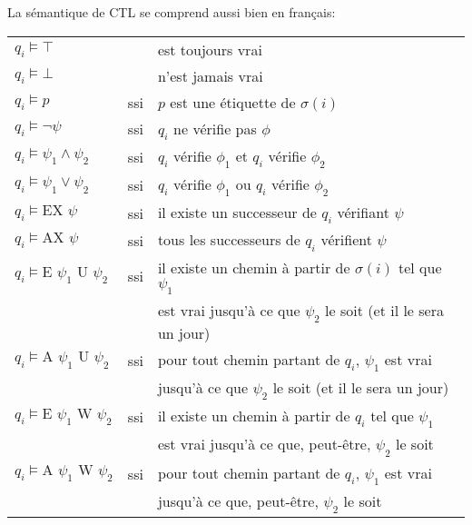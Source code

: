 \documentclass[10pt,a4paper]{article}
\begin{document}
\bigskip

La sémantique de CTL se comprend aussi bien en français:

\begin{tabular}{lcl}
$q_i \vDash \top$ && est toujours vrai\\
$q_i \vDash \bot$ && n'est jamais vrai\\
$q_i \vDash p$ &ssi& $p$ est une étiquette de $\sigma(i)$\\
$q_i \vDash \neg \psi$ &ssi& $q_i$ ne vérifie pas $\phi$\\
$q_i \vDash \psi_1 \land \psi_2$ &ssi& $q_i$ vérifie $\phi_1$ et $q_i$ vérifie $\phi_2$\\
$q_i \vDash \psi_1 \lor \psi_2$ &ssi& $q_i$ vérifie $\phi_1$ ou $q_i$ vérifie $\phi_2$\\
$q_i \vDash \mbox{EX } \psi$ &ssi& il existe un successeur de $q_i$ vérifiant $\psi$\\
$q_i \vDash \mbox{AX } \psi$ &ssi& tous les successeurs de $q_i$ vérifient $\psi$\\
$q_i \vDash \mbox{E } \psi_1 \mbox{ U } \psi_2$ &ssi& il existe un chemin à partir de $\sigma(i)$ tel que $\psi_1$\\&& est vrai jusqu'à ce que $\psi_2$ le soit (et il le sera un jour)\\

$q_i \vDash \mbox{A } \psi_1 \mbox{ U } \psi_2$ &ssi& pour tout chemin partant de $q_i$, $\psi_1$ est vrai \\&& jusqu'à ce que $\psi_2$ le soit (et il le sera un jour)\\

$q_i \vDash \mbox{E } \psi_1 \mbox{ W } \psi_2$ &ssi& il existe un chemin à partir de $q_i$ tel que $\psi_1$\\&& est vrai jusqu'à ce que, peut-être, $\psi_2$ le soit\\

$q_i \vDash \mbox{A } \psi_1 \mbox{ W } \psi_2$ &ssi& pour tout chemin partant de $q_i$, $\psi_1$ est vrai \\&& jusqu'à ce que, peut-être, $\psi_2$ le soit\\
\end{tabular}
\end{document}
